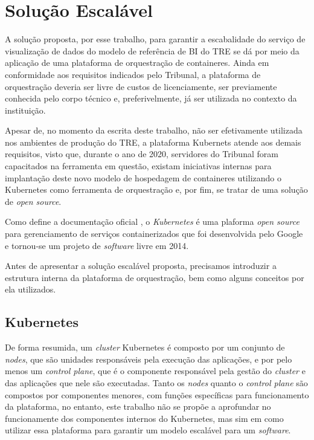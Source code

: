 \section{Solução Escalável}

A solução proposta, por esse trabalho, para garantir a escabalidade do serviço de visualização de dados do modelo de referência de BI do TRE se dá por meio da aplicação de uma plataforma de orquestração de containeres. Ainda em conformidade aos requisitos indicados pelo Tribunal, a plataforma de orquestração deveria ser livre de custos de licenciamente, ser previamente conhecida pelo corpo técnico e, preferivelmente, já ser utilizada no contexto da instituição.

Apesar de,  no momento da escrita deste trabalho, não ser efetivamente utilizada nos ambientes de produção do TRE, a plataforma Kubernets atende aos demais requisitos, visto que, durante o ano de 2020, servidores do Tribunal foram capacitados na ferramenta em questão, existam iniciativas internas para implantação deste novo modelo de hospedagem de containeres utilizando o Kubernetes como ferramenta de orquestração e, por fim, se tratar de uma solução de \textit{open source}.

Como define a documentação oficial \cite{k8sDoc}, o \textit{Kubernetes} é uma plaforma \textit{open source} para gerenciamento de serviços containerizados que foi desenvolvida pelo Google e tornou-se um projeto de \textit{software} livre em 2014.

Antes de apresentar a solução escalável proposta, precisamos introduzir a estrutura interna da plataforma de orquestração, bem como alguns conceitos por ela utilizados.

\subsection{Kubernetes}

De forma resumida, um \textit{cluster} Kubernetes é composto por um conjunto de \textit{nodes}, que são unidades responsáveis pela execução das aplicações, e por pelo menos um \textit{control plane}, que é o componente responsável pela gestão do \textit{cluster} e das aplicações que nele são executadas. Tanto os \textit{nodes} quanto o \textit{control plane} são compostos por componentes menores, com funções específicas para funcionamento da plataforma, no entanto, este trabalho não se propõe a aprofundar no funcionamente dos componentes internos do Kubernetes, mas sim em como utilizar essa plataforma para garantir um modelo escalável para um \textit{software}.

